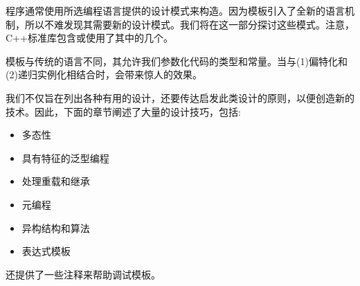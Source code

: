 程序通常使用所选编程语言提供的设计模式来构造。因为模板引入了全新的语言机制，所以不难发现其需要新的设计模式。我们将在这一部分探讨这些模式。注意，C++标准库包含或使用了其中的几个。

模板与传统的语言不同，其允许我们参数化代码的类型和常量。当与(1)偏特化和(2)递归实例化相结合时，会带来惊人的效果。

我们不仅旨在列出各种有用的设计，还要传达启发此类设计的原则，以便创造新的技术。因此，下面的章节阐述了大量的设计技巧，包括:

\begin{itemize}
\item 
多态性

\item 
具有特征的泛型编程

\item 
处理重载和继承

\item 
元编程

\item 
异构结构和算法

\item 
表达式模板
\end{itemize}

还提供了一些注释来帮助调试模板。